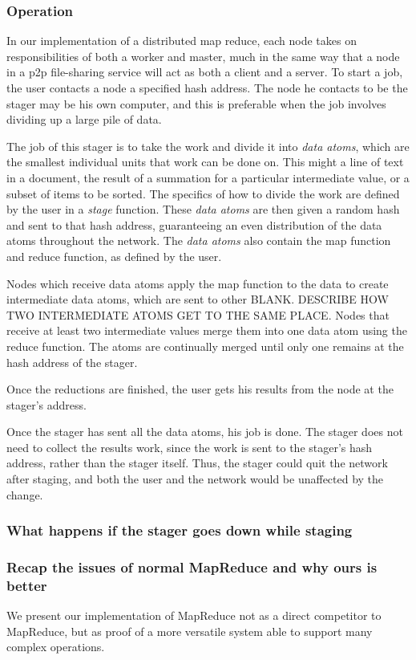 \documentclass[conference, compsocconf, letterpaper]{IEEEtran}
\begin{document}
\subsubsection{Operation}
In our implementation of a distributed map reduce, each node takes on responsibilities of both a worker and master, much in the same way that a node in a p2p file-sharing service will act as both a client and a server.  To start a job, the user contacts a node a specified hash address. The node he contacts to be the stager may be his own computer, and this is preferable when the job involves dividing up a large pile of data. 

The job of this stager is to take the work and divide it into \emph{data atoms}, which are the smallest individual units that work can be done on.  This might a line of text in a document, the result of a summation for a particular intermediate value, or a subset of items to be sorted.  The specifics of how to divide the work are defined by the user in a \emph{stage} function.  These \emph{data atoms} are then given a random hash and sent to that hash address, guaranteeing an even distribution of the data atoms throughout the network.  The \emph{data atoms} also contain the map function and reduce function, as defined by the user.

Nodes which receive data atoms apply the map function to the data to create intermediate data atoms, which are sent to other BLANK.  DESCRIBE HOW TWO INTERMEDIATE ATOMS GET TO THE SAME PLACE.  Nodes that receive at least two intermediate values merge them into one data atom using the reduce function.   The atoms are continually merged until only one remains at the hash address of the stager. 

Once the reductions are finished, the user gets his results from the node at the stager's address.

Once the stager has sent all the data atoms, his job is done.  The stager does not need to collect the results work, since the work is sent to the stager's hash address, rather than the stager itself.  Thus, the stager could quit the network after staging, and both the user and the network would be unaffected by the change.



\subsubsection{What happens if the stager goes down while staging} 

\subsubsection{Recap the issues  of normal MapReduce  and why ours is better} 
We present our implementation of MapReduce not as a direct competitor to MapReduce, but as proof of a more versatile system able to support many complex operations.
\end{document}
